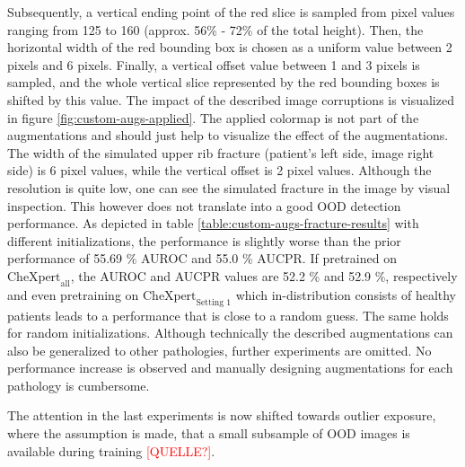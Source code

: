 Subsequently, a vertical ending point of the red slice is sampled from pixel values ranging from 125 to 160 (approx. 56\% - 72\% of the total height).
Then, the horizontal width of the red bounding box is chosen as a uniform value between 2 pixels and 6 pixels.
Finally, a vertical offset value between 1 and 3 pixels is sampled, and the whole vertical slice represented by the red bounding boxes is shifted by this value.
The impact of the described image corruptions is visualized in figure \ref{fig:custom-augs-applied}.
The applied colormap is not part of the augmentations and should just help to visualize the effect of the augmentations.
The width of the simulated upper rib fracture (patient's left side, image right side) is 6 pixel values, while the vertical offset is 2 pixel values.
Although the resolution is quite low, one can see the simulated fracture in the image by visual inspection.
This however does not translate into a good OOD detection performance.
As depicted in table \ref{table:custom-augs-fracture-results} with different initializations, the performance is slightly worse than the prior performance of 55.69 \% AUROC  and 55.0 \% AUCPR.
If pretrained on $\text{CheXpert}_\text{all}$, the AUROC and AUCPR values are 52.2 \% and 52.9 \%, respectively and even pretraining on $\text{CheXpert}_\text{Setting 1}$ which in-distribution consists of healthy patients leads to a performance that is close to a random guess.
The same holds for random initializations.
Although technically the described augmentations can also be generalized to other pathologies, further experiments are omitted.
No performance increase is observed and manually designing augmentations for each pathology is cumbersome.
\par
The attention in the last experiments is now shifted towards outlier exposure, where the assumption is made, that a small subsample of OOD images is available during training \textcolor{red}{[QUELLE?]}.